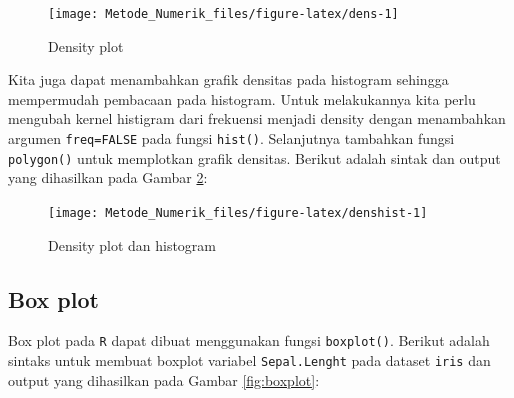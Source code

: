 \documentclass[
]{book}
\newenvironment{Shaded}{\begin{snugshade}}{\end{snugshade}}
\newcommand{\AttributeTok}[1]{\textcolor[rgb]{0.13,0.29,0.53}{#1}}
\newcommand{\CommentTok}[1]{\textcolor[rgb]{0.56,0.35,0.01}{\textit{#1}}}
\newcommand{\ConstantTok}[1]{\textcolor[rgb]{0.56,0.35,0.01}{#1}}
\newcommand{\FunctionTok}[1]{\textcolor[rgb]{0.13,0.29,0.53}{\textbf{#1}}}
\newcommand{\NormalTok}[1]{#1}
\newcommand{\OtherTok}[1]{\textcolor[rgb]{0.56,0.35,0.01}{#1}}
\newcommand{\SpecialCharTok}[1]{\textcolor[rgb]{0.81,0.36,0.00}{\textbf{#1}}}
\newcommand{\StringTok}[1]{\textcolor[rgb]{0.31,0.60,0.02}{#1}}
\theoremstyle{definition}
\theoremstyle{definition}
\theoremstyle{definition}
\theoremstyle{definition}
\theoremstyle{remark}
\begin{document}
\begin{figure}

{\centering \texttt{[image: Metode\_Numerik\_files/figure-latex/dens-1]} 

}

\caption{Density plot}\label{fig:dens}
\end{figure}

Kita juga dapat menambahkan grafik densitas pada histogram sehingga mempermudah pembacaan pada histogram. Untuk melakukannya kita perlu mengubah kernel histigram dari frekuensi menjadi density dengan menambahkan argumen \texttt{freq=FALSE} pada fungsi \texttt{hist()}. Selanjutnya tambahkan fungsi \texttt{polygon()} untuk memplotkan grafik densitas. Berikut adalah sintak dan output yang dihasilkan pada Gambar \ref{fig:denshist}:

\begin{Shaded}
\end{Shaded}

\begin{figure}

{\centering \texttt{[image: Metode\_Numerik\_files/figure-latex/denshist-1]} 

}

\caption{Density plot dan histogram}\label{fig:denshist}
\end{figure}

\hypertarget{boxplot}{%
\subsection{Box plot}\label{boxplot}}

Box plot pada \texttt{R} dapat dibuat menggunakan fungsi \texttt{boxplot()}. Berikut adalah sintaks untuk membuat boxplot variabel \texttt{Sepal.Lenght} pada dataset \texttt{iris} dan output yang dihasilkan pada Gambar \ref{fig:boxplot}:
\end{document}
